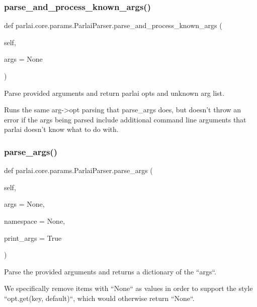 \subsubsection{\texorpdfstring{parse\+\_\+and\+\_\+process\+\_\+known\+\_\+args()}{parse\_and\_process\_known\_args()}}
{\footnotesize\ttfamily def parlai.\+core.\+params.\+Parlai\+Parser.\+parse\+\_\+and\+\_\+process\+\_\+known\+\_\+args (\begin{DoxyParamCaption}\item[{}]{self,  }\item[{}]{args = {\ttfamily None} }\end{DoxyParamCaption})}

\begin{DoxyVerb}Parse provided arguments and return parlai opts and unknown arg list.

Runs the same arg->opt parsing that parse_args does, but doesn't throw an error
if the args being parsed include additional command line arguments that parlai
doesn't know what to do with.
\end{DoxyVerb}
 \mbox{\label{classparlai_1_1core_1_1params_1_1ParlaiParser_ad549d75e2808d63fbc5c5d0e30682f18}} 
\subsubsection{\texorpdfstring{parse\+\_\+args()}{parse\_args()}}
{\footnotesize\ttfamily def parlai.\+core.\+params.\+Parlai\+Parser.\+parse\+\_\+args (\begin{DoxyParamCaption}\item[{}]{self,  }\item[{}]{args = {\ttfamily None},  }\item[{}]{namespace = {\ttfamily None},  }\item[{}]{print\+\_\+args = {\ttfamily True} }\end{DoxyParamCaption})}

\begin{DoxyVerb}Parse the provided arguments and returns a dictionary of the ``args``.

We specifically remove items with ``None`` as values in order to support the
style ``opt.get(key, default)``, which would otherwise return ``None``.
\end{DoxyVerb}
 \mbox{\label{classparlai_1_1core_1_1params_1_1ParlaiParser_a2a98c07f7393108ad67773951038f191}} 
